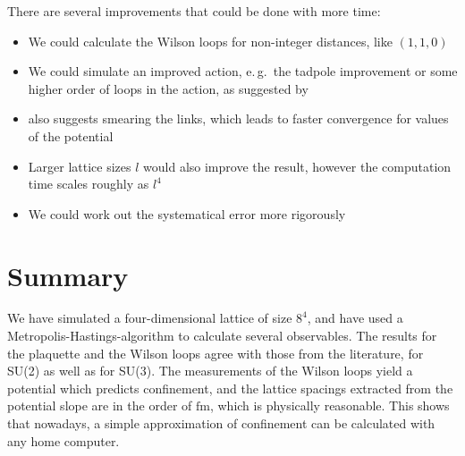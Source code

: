 \documentclass[%
 reprint,
 amsmath,amssymb,
 aps,
]{revtex4-1}
\begin{document}
There are several improvements that could be done with more time:
\begin{itemize}
	\item We could calculate the Wilson loops for non-integer distances, like $(1,1,0)$
	\item We could simulate an improved action, e.\,g.\, the tadpole improvement or some higher order of loops in the action, as suggested by \citet{lepagelqcd}
	\item \citet{lepagelqcd} also suggests smearing the links, which leads to faster convergence for values of the potential
	\item Larger lattice sizes $l$ would also improve the result, however the computation time scales roughly as $l^4$
	\item We could work out the systematical error more rigorously
\end{itemize}


%
%

\section{Summary}

We have simulated a four-dimensional lattice of size $8^4$, and have used a Metropolis-Hastings-algorithm to calculate several observables. The results for the plaquette and the Wilson loops agree with those from the literature, for SU(2) as well as for SU(3). The measurements of the Wilson loops yield a potential which predicts confinement, and the lattice spacings extracted from the potential slope are in the order of $\si{\femto\meter}$, which is physically reasonable. This shows that nowadays, a simple approximation of confinement can be calculated with any home computer. 





\end{document}
